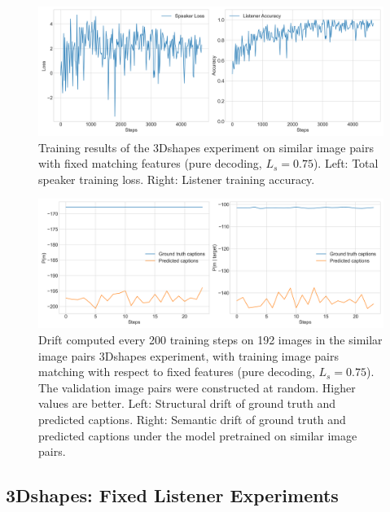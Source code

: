 \begin{figure}[h]
	\centering
	\includegraphics[width=\linewidth]{images/3dshapes_baseline_similarFixed_075_losses.png}
	\caption{Training results of the 3Dshapes experiment on similar image pairs with fixed matching features (pure decoding, $L_s = 0.75$). Left: Total speaker training loss. Right: Listener training accuracy.}
	\label{fig:3dshapes_similarFixed_075_speaker_loss_listener_acc}
\end{figure}

\begin{figure}[h]
	\centering
	\includegraphics[width=\linewidth]{images/3dshapes_baseline_structural_semantic_drift_49_pure_075_similarFixed.png}
	\caption{Drift computed every 200 training steps on 192 images in the similar image pairs 3Dshapes experiment, with training image pairs matching with respect to fixed features (pure decoding, $L_s = 0.75$). The validation image pairs were constructed at random. Higher values are better. Left: Structural drift of ground truth and predicted captions. Right: Semantic drift of ground truth and predicted captions under the model pretrained on similar image pairs.} 
	\label{fig:3dshapes_similarFixed_075_str_sem_drift}
\end{figure}

\subsection{3Dshapes: Fixed Listener Experiments}
\label{expt:3dshapes_fixed}

